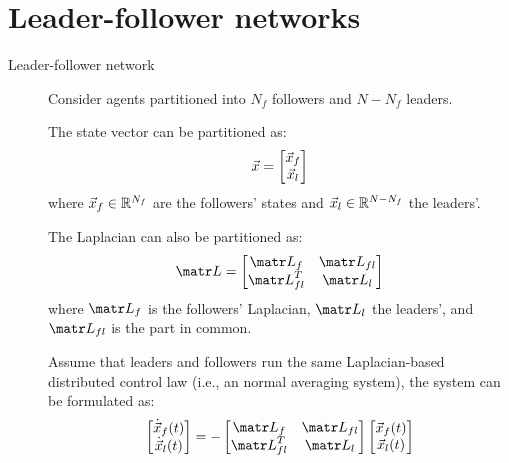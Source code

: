 \chapter{Leader-follower networks}


\begin{description}
    \item[Leader-follower network] 
        Consider agents partitioned into $N_f$ followers and $N-N_f$ leaders.
        
        The state vector can be partitioned as:
        \[ {\vec{x}} = \begin{bmatrix} {\vec{x}}_f \\ {\vec{x}}_l \end{bmatrix} \]
        where ${\vec{x}}_f \in \mathbb{R}^{N_f}$ are the followers' states and ${\vec{x}}_l \in \mathbb{R}^{N-N_f}$ the leaders'.
        
        The Laplacian can also be partitioned as:
        \[
            \lap = \begin{bmatrix} \lap_f & \lap_{fl} \\ \lap_{fl}^T & \lap_l \end{bmatrix}
        \]
        where $\lap_f$ is the followers' Laplacian, $\lap_l$ the leaders', and $\lap_{fl}$ is the part in common.

        Assume that leaders and followers run the same Laplacian-based distributed control law (i.e., an normal averaging system), the system can be formulated as:
        \[
            \begin{bmatrix} \dot{\x}_f(t) \\ \dot{\x}_l(t) \end{bmatrix} =
            - \begin{bmatrix} \lap_f & \lap_{fl} \\ \lap_{fl}^T & \lap_l \end{bmatrix}
            \begin{bmatrix} \x_f(t) \\ \x_l(t) \end{bmatrix}
        \]


\end{description}
